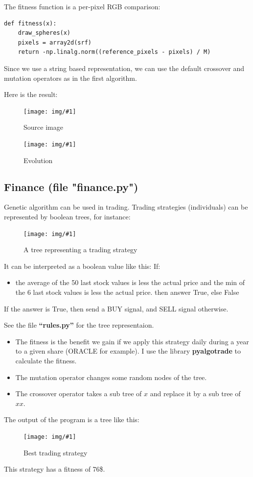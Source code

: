 \documentclass{article}
\newcommand{\IMG}[3]{
\begin{figure}[H]
\centering
\texttt{[image: img/\#1]}%
\caption{#2}%
\label{#1}%
\end{figure}

}
\begin{document}
The fitness function is a per-pixel RGB comparison:

\begin{verbatim}
def fitness(x):
	draw_spheres(x)
	pixels = array2d(srf)
	return -np.linalg.norm((reference_pixels - pixels) / M)
\end{verbatim}

Since we use a string based representation, we can use the default crossover and mutation operators as in the first algorithm.

Here is the result:
\IMG{source.jpg}{Source image}{0.75}

\IMG{evolution.png}{Evolution}{0.75}


\subsection{Finance (file "finance.py")}
Genetic algorithm can be used in trading. Trading strategies (individuals) can be represented by boolean trees, for instance:
\IMG{trading_strategy.png}{A tree representing a trading strategy}{0.75}

It can be interpreted as a boolean value like this: 
If:
\begin{itemize}
	\item the average of the 50 last stock values is less the actual price
and the min of the 6 last stock values is less the actual price. then answer True, else False
\end{itemize}
If the answer is True, then send a BUY signal, and SELL signal otherwise.

See the file \textbf{"`rules.py"'} for the tree representaion.

\begin{itemize}
	\item The fitness is the benefit we gain if we apply this strategy daily during a year to a given share (ORACLE for example). I use the library \textbf{pyalgotrade} to calculate the fitness.
	\item The mutation operator changes some random nodes of the tree.
	\item The crossover operator takes a sub tree of $x$ and replace it by a sub tree of $xx$.
\end{itemize}

The output of the program is a tree like this:
\IMG{best_strategy.png}{Best trading strategy}{0.4}
This strategy has a fitness of 76\$.
\end{document}
